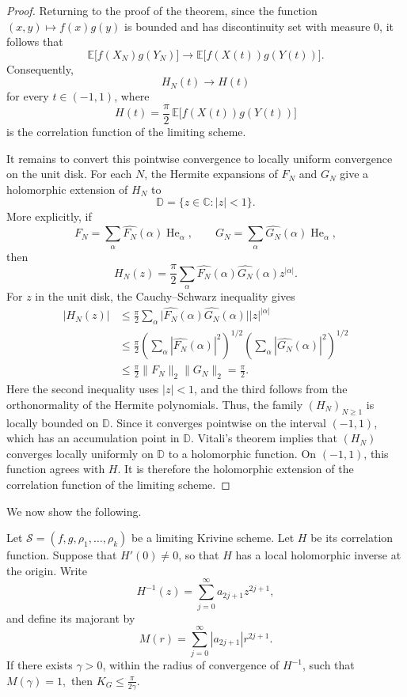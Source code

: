 \begin{proof}
Returning to the proof of the theorem, since the function
\(
(x,y)\longmapsto f(x)g(y)
\)
 is bounded and has discontinuity set with measure 0, it follows that
\[
\mathbb{E}\bigl[f(X_N)g(Y_N)\bigr]
\longrightarrow
\mathbb{E}\bigl[f(X(t))g(Y(t))\bigr].
\]
Consequently,
\[
H_N(t)\longrightarrow H(t)
\]
for every \(t\in(-1,1)\), where
\[
H(t)
=
\frac{\pi}{2}\,
\mathbb{E}\bigl[f(X(t))g(Y(t))\bigr]
\]
is the correlation function of the limiting scheme.

It remains to convert this pointwise convergence to locally uniform
convergence on the unit disk. For each \(N\), the Hermite expansions of
\(F_N\) and \(G_N\) give a holomorphic extension of \(H_N\) to
\[
\mathbb{D}
=
\{z\in\mathbb{C}:|z|<1\}.
\]
More explicitly, if
\[
F_N=\sum_{\alpha}\widehat{F_N}(\alpha)\operatorname{He}_{\alpha},
\qquad
G_N=\sum_{\alpha}\widehat{G_N}(\alpha)\operatorname{He}_{\alpha},
\]
then
\[
H_N(z)
=
\frac{\pi}{2}
\sum_{\alpha}
\widehat{F_N}(\alpha)\widehat{G_N}(\alpha)z^{|\alpha|}.
\]
For \(z\) in the unit disk, the Cauchy--Schwarz inequality gives
\[
\begin{aligned}
|H_N(z)|
&\leq
\frac{\pi}{2}
\sum_{\alpha}
\bigl|
\widehat{F_N}(\alpha)\widehat{G_N}(\alpha)
\bigr|
|z|^{|\alpha|} \\
&\leq
\frac{\pi}{2}
\left(
\sum_{\alpha}
|\widehat{F_N}(\alpha)|^2
\right)^{1/2}
\left(
\sum_{\alpha}
|\widehat{G_N}(\alpha)|^2
\right)^{1/2} \\
&\leq
\frac{\pi}{2}
\|F_N\|_2\|G_N\|_2
=
\frac{\pi}{2}.
\end{aligned}
\]
Here the second inequality uses \(|z|<1\), and the third follows from
the orthonormality of the Hermite polynomials.
Thus, the family \((H_N)_{N\geq 1}\) is locally bounded on \(\mathbb{D}\).
Since it converges pointwise on the interval \((-1,1)\), which has an
accumulation point in \(\mathbb{D}\). Vitali's theorem implies that
\((H_N)\) converges locally uniformly on \(\mathbb{D}\) to a holomorphic
function. On \((-1,1)\), this function agrees with \(H\). It is therefore
the holomorphic extension of the correlation function of the limiting
scheme.
\end{proof}
We now show the following. 
\begin{theorem}
\label{thm:upper_bound_limiting_scheme}
Let
\(
\mathcal{S}=(f,g,\rho_1,\ldots,\rho_k)
\)
be a limiting Krivine scheme. Let \(H\) be its correlation
function. Suppose that \(H'(0)\neq 0\), so that \(H\) has a local holomorphic inverse
at the origin. Write
\[
H^{-1}(z)
=
\sum_{j=0}^{\infty}a_{2j+1}z^{2j+1},
\]
and define its majorant by
\[
M(r)
=
\sum_{j=0}^{\infty}|a_{2j+1}|r^{2j+1}.
\]
If there exists \(\gamma>0\), within the radius of convergence of
\(H^{-1}\), such that
\(
M(\gamma)=1,
\)
then
\(
K_G
\leq
\frac{\pi}{2\gamma}.
\)
\end{theorem}


